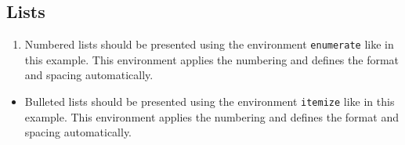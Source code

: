 \subsection{Lists}
\label{subsec:lists}

\begin{enumerate}
  \item Numbered lists should be presented using the environment \verb|enumerate| like in this example. 
  This environment applies the numbering and defines the format and spacing automatically. 
\end{enumerate}

\begin{itemize}
  \item Bulleted lists should be presented using the environment \verb|itemize| like in this example. 
  This environment applies the numbering and defines the format and spacing automatically. 
\end{itemize}

